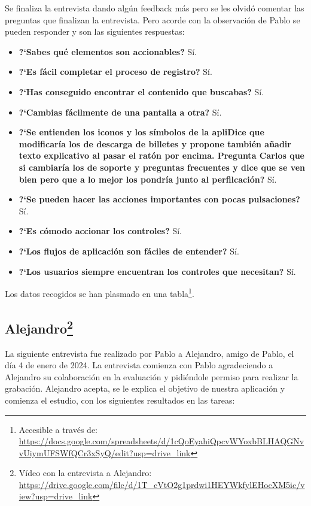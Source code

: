 Se finaliza la entrevista dando algún feedback más pero se les olvidó comentar las preguntas que finalizan la entrevista. Pero acorde con la observación de Pablo se pueden responder y son las siguientes respuestas:

\begin{itemize}
    \item \textbf{?`Sabes qué elementos son accionables?} Sí. 
    \item \textbf{?`Es fácil completar el proceso de registro?} Sí. 
    \item \textbf{?`Has conseguido encontrar el contenido que buscabas?} Sí.
    \item \textbf{?`Cambias fácilmente de una pantalla a otra?} Sí.
    \item \textbf{?`Se entienden los iconos y los símbolos de la apliDice que modificaría los de descarga de billetes y propone
    también añadir texto explicativo al pasar el ratón por encima. Pregunta Carlos que si cambiaría los de soporte y preguntas frecuentes
    y dice que se ven bien pero que a lo mejor los pondría junto al perfilcación?} Sí.
    \item \textbf{?`Se pueden hacer las acciones importantes con pocas pulsaciones?} Sí.
    \item \textbf{?`Es cómodo accionar los controles?} Sí.
    \item \textbf{?`Los flujos de aplicación son fáciles de entender?} Sí.
    \item \textbf{?`Los usuarios siempre encuentran los controles que necesitan?} Sí.
\end{itemize}

Los datos recogidos se han plasmado en una tabla\footnote{Accesible a través de:
 \url{https://docs.google.com/spreadsheets/d/1cQoEyahiQpcvWYoxbBLHAQGNvvUiymUFSWfQCr3xSyQ/edit?usp=drive_link}}.

\subsection[Alejandro]{Alejandro\footnote{Vídeo con la entrevista a Alejandro: \url{https://drive.google.com/file/d/1T_cVtO2g1prdwi1HEYWkfylEHocXM5ic/view?usp=drive_link}}}

La siguiente entrevista fue realizado por Pablo a Alejandro, amigo de Pablo, el día 4 de enero de 2024. La entrevista
comienza con Pablo agradeciendo a Alejandro su colaboración en la evaluación y pidiéndole permiso para realizar la grabación. Alejandro
acepta, se le explica el objetivo de nuestra aplicación y comienza el estudio, con los siguientes resultados en las tareas:

